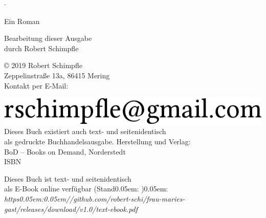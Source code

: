 



\begin{titlepage}
\pagestyle{empty}

\begin{center}

\buchautor{}\enspace$\cdot$\enspace\buchtitel{}

\cleartooddpage

\null

\vspace{4.25ex}
\LARGE
\buchautor{}

\vspace{4ex}
\Huge
\ifdefined\ebook
\textcolor{c-headline}{\buchtitel}
\else
\buchtitel
\fi

\vspace{2ex}

\large
Ein Roman

\vfill

\normalfont\normalsize
Bearbeitung dieser Ausgabe\\
durch Robert Schimpfle

\null


\clearpage

\null

\vfill

\normalfont\small
\begin{center}
© 2019 Robert Schimpfle\\
\ifdefined\ebook
Zeppelinstraße 13a,
86415 Mering\\
Kontakt per E-Mail:

\vspace*{0.65ex}

\includegraphics[height=2.2ex]{email-robert-schimpfle.png}\\
\vspace*{-0.45ex}
Dieses Buch existiert auch text- und seitenidentisch\\
als gedruckte Buchhandelsausgabe.
\else
Herstellung und Verlag:\\
BoD – Books on Demand, Norderstedt\\
ISBN \ISBN{}

\vspace{0.5ex}

Dieses Buch ist text- und seitenidentisch\\
als E-Book online verfügbar (Stand\kern 0.05em: \standonline{})\kern 0.05em:\\
\textit{https\kern 0.05em:\kern 0.05em//github.com/robert-schi/\allowbreak{}frau-maries-gast/\allowbreak{}releases/download/v1.0/text-ebook.pdf}
\fi
\end{center}

\end{center}

\end{titlepage}
